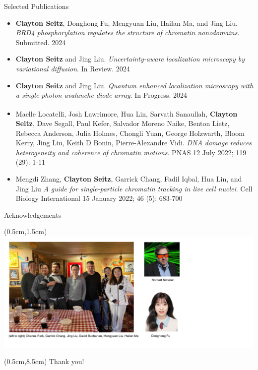 \documentclass{beamer}					%
\begin{document}
\begin{frame}{Selected Publications}

\begin{itemize}

\item \textbf{Clayton Seitz}, Donghong Fu, Mengyuan Liu, Hailan Ma, and Jing Liu. \textit{BRD4 phosphorylation regulates the structure of chromatin nanodomains}. Submitted. 2024


\item \textbf{Clayton Seitz} and Jing Liu. \textit{Uncertainty-aware localization microscopy by variational diffusion}. In Review. 2024

\item \textbf{Clayton Seitz} and Jing Liu. \textit{Quantum enhanced localization microscopy with a single photon avalanche diode array}. In Progress. 2024

\item Maelle Locatelli\textsuperscript{\textdagger}, Josh Lawrimore\textsuperscript{\textdagger}, Hua Lin\textsuperscript{\textdagger}, Sarvath Sanaullah, \textbf{Clayton Seitz}, Dave Segall, Paul Kefer, Salvador Moreno Naike, Benton Lietz, Rebecca Anderson, Julia Holmes, Chongli Yuan, George Holzwarth, Bloom Kerry, Jing Liu, Keith D Bonin, Pierre-Alexandre Vidi. \textit{DNA damage reduces heterogeneity and coherence of chromatin motions}. PNAS 12 July 2022; 119 (29): 1-11

\item Mengdi Zhang, \textbf{Clayton Seitz}, Garrick Chang, Fadil Iqbal, Hua Lin, and Jing Liu \textit{A guide for single-particle chromatin tracking in live cell nuclei}. Cell Biology International 15 January 2022; 46 (5): 683-700


\end{itemize}
\end{frame}


\begin{frame}{Acknowledgements}
\begin{textblock*}{16cm}(0.5cm,1.5cm)
\includegraphics[width=16cm]{../../dissertation/dissertation/media/Lab.png}
\end{textblock*}

\begin{textblock*}{14cm}(0.5cm,8.5cm)
Thank you!
\end{textblock*}

\end{frame}
\end{document}

